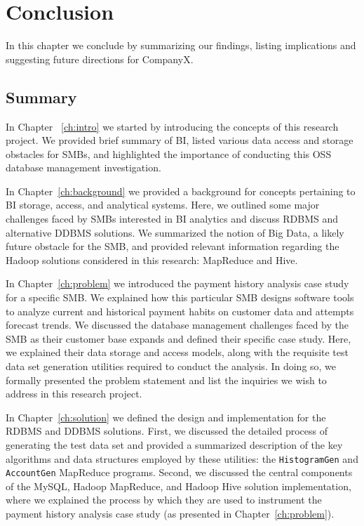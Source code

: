 %
%
 
\chapter{Conclusion} \label{ch:conclusion}
In this chapter we conclude by summarizing our findings, listing implications and suggesting future directions for CompanyX.

\section{Summary}
In Chapter ~\ref{ch:intro} we started by introducing the concepts of this research project. We provided brief summary of BI, listed various data access and storage obstacles for SMBs, and highlighted the importance of conducting this OSS database management investigation.

In Chapter~\ref{ch:background} we provided a background for concepts pertaining to BI storage, access, and analytical systems. Here, we outlined some major challenges faced by SMBs interested in BI analytics and discuss RDBMS and alternative DDBMS solutions. We summarized the notion of Big Data, a likely future obstacle for the SMB, and provided relevant information regarding the Hadoop solutions considered in this research: MapReduce and Hive.

In Chapter~\ref{ch:problem} we introduced the payment history analysis case study for a specific SMB. We explained how this particular SMB designs software tools to analyze current and historical payment habits on customer data and attempts forecast trends. We discussed the database management challenges faced by the SMB as their customer base expands and defined their specific case study. Here, we explained their data storage and access models, along with the requisite test data set generation utilities required to conduct the analysis. In doing so, we formally presented the problem statement and list the inquiries we wish to address in this research project.

In Chapter~\ref{ch:solution} we defined the design and implementation for the RDBMS and DDBMS solutions. First, we discussed the detailed process of generating the test data set and provided a summarized description of the key algorithms and data structures employed by these utilities: the \texttt{HistogramGen} and \texttt{AccountGen} MapReduce programs. Second, we discussed the central components of the MySQL, Hadoop MapReduce, and Hadoop Hive solution implementation, where we explained the process by which they are used to instrument the payment history analysis case study (as presented in Chapter~\ref{ch:problem}).

